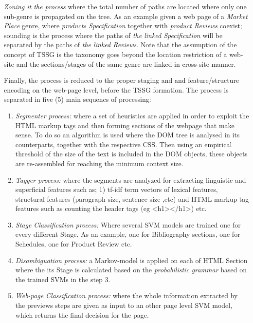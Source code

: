 \textit{Zoning it the process} where the total number of paths are located where only one sub-genre is propagated on the tree. As an example given a web page of a \textit{Market Place} genre, where \textit{products Specification} together with \textit{product Reviews} coexist; sounding is the process where the paths of \textit{the linked Specification} will be separated by the paths of \textit{the linked Reviews}. Note that the assumption of the concept of TSSG is the taxonomy goes beyond the location restriction of a web-site and the sections/stages of the same genre are linked in cross-site manner.

Finally, the process is reduced to the proper staging and and feature/structure encoding on the web-page level, before the TSSG formation. The process is separated in five (5) main sequencs of processing:

\begin{enumerate}
\item \textit{Segmenter process:} where a set of heuristics are applied in order to exploit the HTML markup tags and then forming sections of the webpage that make sense. To do so an algorithm is used where the DOM tree is analysed in its counterparts, together with the respective CSS. Then using an empirical threshold of the size of the text is included in the DOM objects, these objects are re-assembled for reaching the minimum context size.
\item \textit{Tagger process:} where the segments are analyzed for extracting linguistic and superficial features such as; 1) tf-idf term vectors of lexical features, structural features (paragraph size, sentence size ,etc) and HTML markup tag features such as counting the header tags (eg <h1></h1>) etc.
\item \textit{Stage Classification process:} Where several SVM models are trained one for every different Stage. As an example, one for Bibliography sections, one for Schedules, one for Product Review etc.
\item \textit{Disambiguation process:} a Markov-model is applied on each of  HTML Section where the its Stage is calculated based on the \textit{probabilistic grammar} based on the trained SVMs in the step 3.
\item \textit{Web-page Classification process:} where the whole information extracted by the previews steps are given as input to an other page level SVM model, which returns the final decision for the page. 
\end{enumerate}


